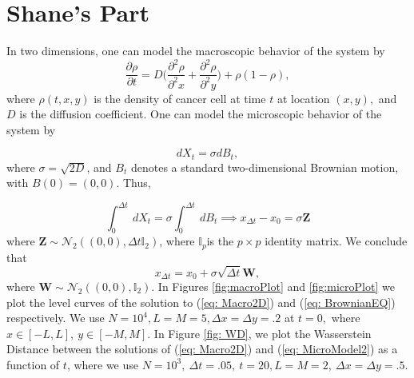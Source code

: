 \documentclass[10pt, margins = .5in]{article}
\begin{document}
\section{Shane's Part}
In two dimensions, one can model the macroscopic behavior of the system by
\begin{equation}
\frac{\partial \rho}{\partial t} = D\Big(\frac{\partial^2 \rho}{\partial^2 x} + \frac{\partial^2 \rho}{\partial^2 y}\Big) + \rho(1-\rho),
\label{eq: Macro2D}
\end{equation}
where $\rho(t,x,y)$ is the density of cancer cell at time $t$ at location $(x,y),$ and $D$ is the diffusion coefficient. One can model the microscopic behavior of the system by 

\begin{equation}
dX_t = \sigma dB_t,
\label{eq: MicroModel2}
\end{equation}
where $\sigma = \sqrt{2D}$, and $B_t$ denotes a standard two-dimensional Brownian motion, with $B(0) = (0,0)$. Thus,

\begin{equation}
\int_0^{\Delta t} \ dX_t = \sigma \int_{0}^{\Delta t} \ dB_t \implies x_{\Delta t} - x_0 = \sigma \textbf{Z}
\end{equation}
where $\textbf{Z} \sim \mathcal{N}_2((0, 0), \Delta t \mathbb{I}_2)$, where $\mathbb{I}_p$is the $p \times p$ identity matrix. We conclude that
\begin{equation}
x_{\Delta t} = x_0 + \sigma \sqrt{\Delta t}\textbf{W},
\label{eq: BrownianEQ}
\end{equation} 
where $\textbf{W} \sim \mathcal{N}_2((0,0), \mathbb{I}_2).$ In Figures \ref{fig:macroPlot} and \ref{fig:microPlot} we plot the level curves of the solution to (\ref{eq: Macro2D}) and (\ref{eq: BrownianEQ}) respectively. We use $N = 10^4, L = M = 5, \Delta x = \Delta y = .2$ at $t = 0,$ where $x \in [-L, L], \ y \in [-M, M]$.
In Figure \ref{fig: WD}, we plot the Wasserstein Distance between the solutions of (\ref{eq: Macro2D}) and (\ref{eq: MicroModel2}) as a function of $t$, where we use $N = 10^3,\ \Delta t = .05, \ t = 20, L = M  = 2, \ \Delta x = \Delta y = .5.$ 
\end{document}
